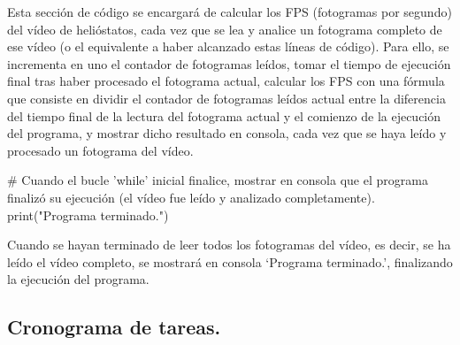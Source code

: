 Esta sección de código se encargará de calcular los FPS (fotogramas por segundo) del vídeo de helióstatos, cada vez que se lea y analice un fotograma completo de ese vídeo (o el equivalente a haber alcanzado estas líneas de código). Para ello, se incrementa en uno el contador de fotogramas leídos, tomar el tiempo de ejecución final tras haber procesado el fotograma actual, calcular los FPS con una fórmula que consiste en dividir el contador de fotogramas leídos actual entre la diferencia del tiempo final de la lectura del fotograma actual y el comienzo de la ejecución del programa, y mostrar dicho resultado en consola, cada vez que se haya leído y procesado un fotograma del vídeo.


\# Cuando el bucle 'while' inicial finalice, mostrar en consola que el programa finalizó su ejecución (el vídeo fue leído y analizado completamente).
print("Programa terminado.")

Cuando se hayan terminado de leer todos los fotogramas del vídeo, es decir, se ha leído el vídeo completo, se mostrará en consola ‘Programa terminado.’, finalizando la ejecución del programa.

\subsection{Cronograma de tareas.}

